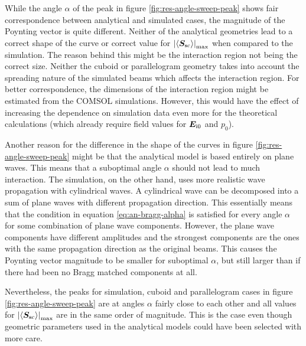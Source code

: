 \documentclass[11pt,twoside]{eitExjobb}
\begin{document}
	While the angle $\alpha$ of the peak in figure \ref{fig:res-angle-sweep-peak} shows fair correspondence between analytical and simulated cases, the magnitude of the Poynting vector is quite different. Neither of the analytical geometries lead to a correct shape of the curve or correct value for $\left| \left< \bm{S}_{\mathrm{sc}} \right> \right|_{\mathrm{max}}$ when compared to the simulation. The reason behind this might be the interaction region not being the correct size. Neither the cuboid or parallelogram geometry takes into account the spreading nature of the simulated beams which affects the interaction region. For better correspondence, the dimensions of the interaction region might be estimated from the COMSOL simulations. However, this would have the effect of increasing the dependence on simulation data even more for the theoretical calculations (which already require field values for $\bm{E}_{\mathrm{i0}}$ and $p_0$).
	
	Another reason for the difference in the shape of the curves in figure \ref{fig:res-angle-sweep-peak} might be that the analytical model is based entirely on plane waves. This means that a suboptimal angle $\alpha$ should not lead to much interaction. The simulation, on the other hand, uses more realistic wave propagation with cylindrical waves. A cylindrical wave can be decomposed into a sum of plane waves with different propagation direction. This essentially means that the condition in equation \eqref{eq:an-bragg-alpha} is satisfied for every angle $\alpha$ for some combination of plane wave components. However, the plane wave components have different amplitudes and the strongest components are the ones with the same propagation direction as the original beams. This causes the Poynting vector magnitude to be smaller for suboptimal $\alpha$, but still larger than if there had been no Bragg matched components at all.
	
	Nevertheless, the peaks for simulation, cuboid and parallelogram cases in figure \ref{fig:res-angle-sweep-peak} are at angles $\alpha$ fairly close to each other and all values for $\left| \left< \bm{S}_{\mathrm{sc}} \right> \right|_{\mathrm{max}}$ are in the same order of magnitude. This is the case even though geometric parameters used in the analytical models could have been selected with more care. 
	
\end{document}
